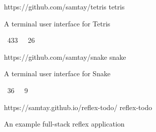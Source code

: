 \vspace{0.25em}
\begin{cvprojects}
  \cvproject
    {https://github.com/samtay/tetris}
    {tetris}
    {\begin{cvitems}
        \item A terminal user interface for Tetris
        \item {\color{graytext} \faStarO \, 433 $\;$ \faCodeFork \, 26}
     \end{cvitems}}
  \cvproject
    {https://github.com/samtay/snake}
    {snake}
    {\begin{cvitems}
        \item A terminal user interface for Snake
        \item {\color{graytext} \faStarO \, 36 $\;$ \faCodeFork \, 9}
     \end{cvitems}}
  \cvproject
    {https://samtay.github.io/reflex-todo/}
    {reflex-todo}
    {\begin{cvitems}
        \item An example full-stack reflex application
     \end{cvitems}}
\end{cvprojects}
